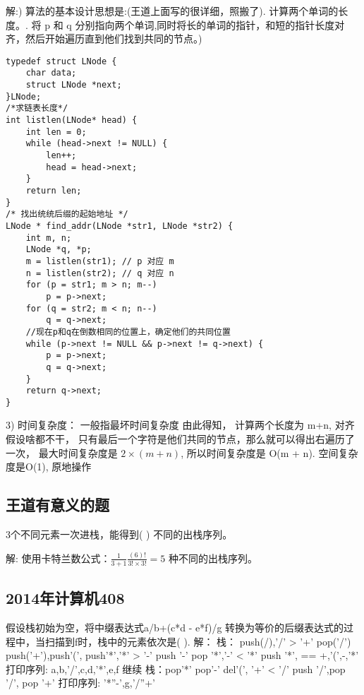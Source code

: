 解:)\newline
算法的基本设计思想是:(王道上面写的很详细，照搬了). 计算两个单词的长度。. 将 p 和 q 分别指向两个单词,同时将长的单词的指针，和短的指针长度对齐，然后开始遍历直到他们找到共同的节点。)\newline
\begin{lstlisting}[basicstyle=\small\ttfamily, caption={}, numbers=none]
typedef struct LNode {
	char data;
	struct LNode *next;
}LNode;
/*求链表长度*/
int listlen(LNode* head) {
	int len = 0;
	while (head->next != NULL) {
		len++;
		head = head->next;
	}
	return len;
}
/* 找出统统后缀的起始地址 */
LNode * find_addr(LNode *str1, LNode *str2) {
	int m, n;
	LNode *q, *p;
	m = listlen(str1); // p 对应 m
	n = listlen(str2); // q 对应 n
	for (p = str1; m > n; m--)
		p = p->next;
	for (q = str2; m < n; n--)
		q = q->next;
	//现在p和q在倒数相同的位置上，确定他们的共同位置
	while (p->next != NULL && p->next != q->next) {
		p = p->next;
		q = q->next;
	}
	return q->next;
}
\end{lstlisting}
3)\newline
时间复杂度：\newline
{\color{red}一般指最坏时间复杂度} 由此得知， 计算两个长度为  m+n, 对齐假设啥都不干， 只有最后一个字符是他们共同的节点，那么就可以得出右遍历了一次， 最大时间复杂度是 $ 2 \times (m + n) $, 所以时间复杂度是 O(m + n). 空间复杂度是O(1), 原地操作

\subsection{王道有意义的题}
3个不同元素一次进栈，能得到( ) 不同的出栈序列。\newline

解:\newline
使用卡特兰数公式：$\frac{1}{3+1}\frac{(6)!}{3! \times 3!} = 5$ 种不同的出栈序列。

\subsection{2014年计算机408}
假设栈初始为空，将中缀表达式a/b+(c*d - e*f)/g 转换为等价的后缀表达式的过程中，当扫描到f时，栈中的元素依次是( ).\newline
解：\newline
栈： push(/),'/' > '+' pop('/') push('+'),push'(', push'*','*' > '-' push '-' pop '*','-' < '*'  push '*', == +,'(',-,'*'\newline
打印序列: a,b,'/',c,d,'*',e,f \newline
继续\newline
栈：pop'*' pop'-' del'(', '+' < '/' push '/',pop '/', pop '+'\newline
打印序列: '*''-',g,'/''+'\newline






